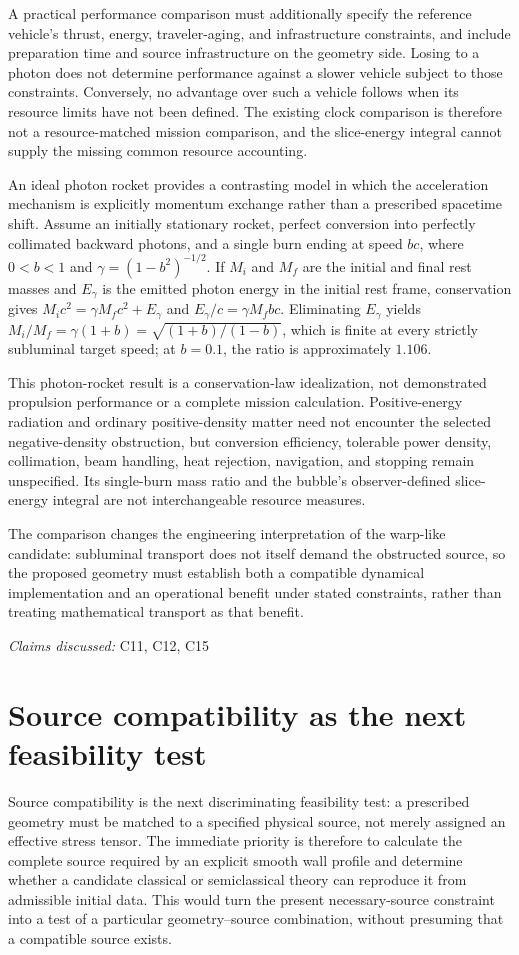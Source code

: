 \documentclass[11pt]{article}
\begin{document}
A practical performance comparison must additionally specify the reference vehicle's thrust, energy, traveler-aging, and infrastructure constraints, and include preparation time and source infrastructure on the geometry side. Losing to a photon does not determine performance against a slower vehicle subject to those constraints. Conversely, no advantage over such a vehicle follows when its resource limits have not been defined. The existing clock comparison is therefore not a resource-matched mission comparison, and the slice-energy integral cannot supply the missing common resource accounting.

An ideal photon rocket provides a contrasting model in which the acceleration mechanism is explicitly momentum exchange rather than a prescribed spacetime shift. Assume an initially stationary rocket, perfect conversion into perfectly collimated backward photons, and a single burn ending at speed $bc$, where $0<b<1$ and $\gamma=(1-b^2)^{-1/2}$. If $M_i$ and $M_f$ are the initial and final rest masses and $E_\gamma$ is the emitted photon energy in the initial rest frame, conservation gives $M_ic^2=\gamma M_fc^2+E_\gamma$ and $E_\gamma/c=\gamma M_fbc$. Eliminating $E_\gamma$ yields $M_i/M_f=\gamma(1+b)=\sqrt{(1+b)/(1-b)}$, which is finite at every strictly subluminal target speed; at $b=0.1$, the ratio is approximately $1.106$.

This photon-rocket result is a conservation-law idealization, not demonstrated propulsion performance or a complete mission calculation. Positive-energy radiation and ordinary positive-density matter need not encounter the selected negative-density obstruction, but conversion efficiency, tolerable power density, collimation, beam handling, heat rejection, navigation, and stopping remain unspecified. Its single-burn mass ratio and the bubble's observer-defined slice-energy integral are not interchangeable resource measures.

The comparison changes the engineering interpretation of the warp-like candidate: subluminal transport does not itself demand the obstructed source, so the proposed geometry must establish both a compatible dynamical implementation and an operational benefit under stated constraints, rather than treating mathematical transport as that benefit.

\textit{Claims discussed: }C11, C12, C15
\section{Source compatibility as the next feasibility test}
Source compatibility is the next discriminating feasibility test: a prescribed geometry must be matched to a specified physical source, not merely assigned an effective stress tensor. The immediate priority is therefore to calculate the complete source required by an explicit smooth wall profile and determine whether a candidate classical or semiclassical theory can reproduce it from admissible initial data. This would turn the present necessary-source constraint into a test of a particular geometry–source combination, without presuming that a compatible source exists.
\end{document}
